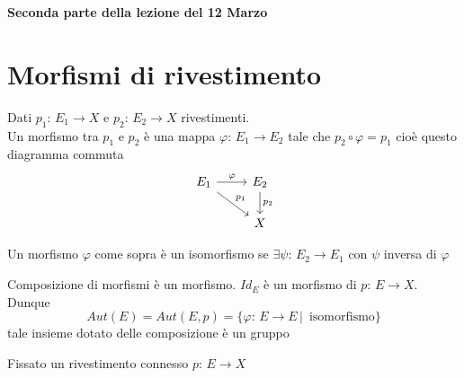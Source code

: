 

\textbf{Seconda parte della lezione del 12  Marzo}
\section{Morfismi di rivestimento}
\begin{defn}Dati $p_1:\, E_1 \to X$ e $p_2:\, E_2 \to X$ rivestimenti.\\
Un morfismo tra $p_1$ e $p_2$ \`e una mappa $\varphi:\, E_1 \to E_2$ tale che $p_2 \circ \varphi=p_1$ cio\`e questo diagramma commuta
$$\begin{tikzcd} E_1 \arrow{rd}{p_1} \arrow{r}{\varphi} & E_2 \arrow{d}{p_2}\\
& X
\end{tikzcd}$$

\end{defn}
\begin{defn}Un morfismo $\varphi$ come sopra  \`e un isomorfismo se $\exists \psi:\, E_2 \to E_1$ con $\psi$ inversa di $\varphi$
\end{defn}
\begin{oss}Composizione di morfismi \`e un morfismo. $Id_E$ \`e un morfismo di $p:\, E \to X$.\\
Dunque
$$ Aut(E)=Aut(E,p)=\{ \varphi:\, E \to E\, \vert \, \text{ isomorfismo} \} $$
tale insieme dotato delle composizione \`e un gruppo
\end{oss}
\spazio 
Fissato un rivestimento connesso $p:\, E \to X$ 
